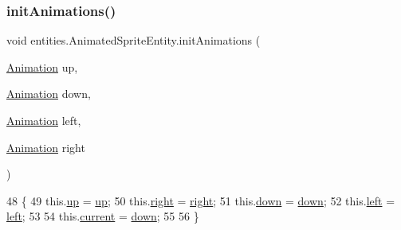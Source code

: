 \subsubsection{\texorpdfstring{init\+Animations()}{initAnimations()}}
{\footnotesize\ttfamily void entities.\+Animated\+Sprite\+Entity.\+init\+Animations (\begin{DoxyParamCaption}\item[{\mbox{\hyperlink{classorg_1_1newdawn_1_1slick_1_1_animation}{Animation}}}]{up,  }\item[{\mbox{\hyperlink{classorg_1_1newdawn_1_1slick_1_1_animation}{Animation}}}]{down,  }\item[{\mbox{\hyperlink{classorg_1_1newdawn_1_1slick_1_1_animation}{Animation}}}]{left,  }\item[{\mbox{\hyperlink{classorg_1_1newdawn_1_1slick_1_1_animation}{Animation}}}]{right }\end{DoxyParamCaption})\hspace{0.3cm}{\ttfamily [inline]}}


\begin{DoxyCode}
48                                                                                               \{
49         this.\mbox{\hyperlink{classentities_1_1_animated_sprite_entity_aa3f0c36879bc4afe3d25f744f357b5b6}{up}} = \mbox{\hyperlink{classentities_1_1_animated_sprite_entity_aa3f0c36879bc4afe3d25f744f357b5b6}{up}};
50         this.\mbox{\hyperlink{classentities_1_1_animated_sprite_entity_acae197ec16525f140d7285eec19e18da}{right}} = \mbox{\hyperlink{classentities_1_1_animated_sprite_entity_acae197ec16525f140d7285eec19e18da}{right}};
51         this.\mbox{\hyperlink{classentities_1_1_animated_sprite_entity_a770f7c34cd976991f59b6701d670d974}{down}} = \mbox{\hyperlink{classentities_1_1_animated_sprite_entity_a770f7c34cd976991f59b6701d670d974}{down}};
52         this.\mbox{\hyperlink{classentities_1_1_animated_sprite_entity_ae706cd48f3aeb5cac587490c5317553d}{left}} = \mbox{\hyperlink{classentities_1_1_animated_sprite_entity_ae706cd48f3aeb5cac587490c5317553d}{left}};
53 
54         this.\mbox{\hyperlink{classentities_1_1_animated_sprite_entity_ab44999a4be67c7ce81f4da6b5d333ce5}{current}} = \mbox{\hyperlink{classentities_1_1_animated_sprite_entity_a770f7c34cd976991f59b6701d670d974}{down}};
55 
56     \}
\end{DoxyCode}
\mbox{\label{classentities_1_1_animated_sprite_entity_a818215ee10658afedf17eef3b002d7c1}} 
